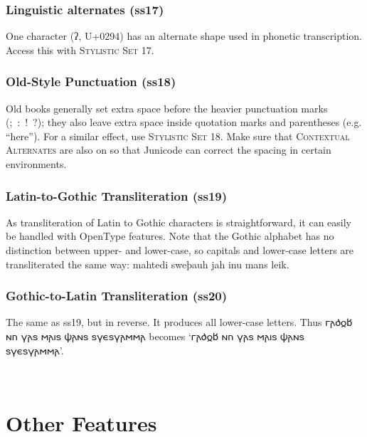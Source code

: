\documentclass[12pt,a4paper,openany]{book}
\begin{document}
\subsection*{Linguistic alternates (ss17)}

One character (ʔ, U+0294) has an alternate shape used in phonetic
transcription. Access this with {\scshape Stylistic Set 17}.

\subsection*{Old-Style Punctuation (ss18)}

{Old books generally set
extra space before the heavier punctuation marks (; : ! ?);
they also leave extra space inside quotation marks and
parentheses (e.g. “here”). For a similar effect, use {\scshape Stylistic Set 18}. Make sure
that {\scshape Contextual Alternates} are also on so that Junicode can correct
the spacing in certain environments.}

\subsection*{Latin-to-Gothic Transliteration (ss19)}

As transliteration of Latin to Gothic characters is straightforward,
it can easily be handled with OpenType features. Note that the Gothic
alphabet has no distinction between upper- and lower-case, so capitals
and lower-case letters are transliterated the same way:
{ mahtedi sweþauh jah inu mans leik}.

\subsection*{Gothic-to-Latin Transliteration (ss20)}

The same as ss19, but in reverse. It produces all lower-case
letters. Thus 𐌲𐌰𐌳𐍉𐌱 𐌽𐌿 𐍅𐌰𐍃 𐌼𐌰𐌹𐍃 𐌸𐌰𐌽𐍃 𐍃𐍅𐌴𐍃𐍅𐌰𐌼𐌼𐌰
becomes ‘{𐌲𐌰𐌳𐍉𐌱 𐌽𐌿 𐍅𐌰𐍃 𐌼𐌰𐌹𐍃 𐌸𐌰𐌽𐍃 𐍃𐍅𐌴𐍃𐍅𐌰𐌼𐌼𐌰}’.

\begin{center}
\huge {\color{myRed}}
\end{center}

\chapter*{\color{myBlue}Other Features}
\end{document}
